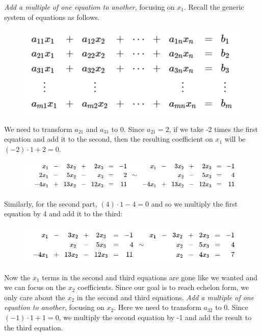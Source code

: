         \textit{Add a multiple of one equation to another}, focusing on $x_1$. Recall the generic system of equations as follows.

        \begin{figure}[hbt!]
            \centering
            \includegraphics[scale = 0.75]{Assets/1_Generic_Linear_System}
        \end{figure}

        We need to transform $a_{21}$ and $a_{31}$ to 0. Since $a_{21} = 2$, if we take -2 times the first equation and add it to the second, then the resulting coefficient on $x_1$ will be $(-2) \cdot 1 + 2 = 0$.

        \begin{figure}[hbt!]
            \centering
            \includegraphics[scale = 0.75]{Assets/1_Transformation_Example}
        \end{figure}

        Similarly, for the second part, $(4)\cdot 1-4=0$ and so we multiply the first equation by 4 and add it to the third:

        \begin{figure}[hbt!]
            \centering
            \includegraphics[scale = 0.75]{Assets/1_Transformation_Example2}
        \end{figure}

        Now the $x_1$ terms in the second and third equations are gone like we wanted and we can focus on the $x_2$ coefficients. Since our goal is to reach echelon form, we only care about the $x_2$ in the second and
        third equations. \textit{Add a multiple of one equation to another}, focusing on $x_2$. Here we need to transform $a_{32}$ to 0. Since $(-1)\cdot 1+1=0$, we multiply the second equation by -1 and add the result
        to the third equation.

